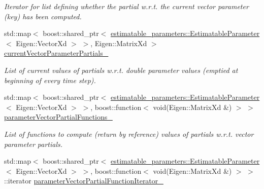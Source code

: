 \begin{DoxyCompactItemize}
\begin{DoxyCompactList}\small\item\em Iterator for list defining whether the partial w.\+r.\+t. the current vector parameter (key) has been computed. \end{DoxyCompactList}\item 
std\+::map$<$ boost\+::shared\+\_\+ptr$<$ \hyperlink{classtudat_1_1estimatable__parameters_1_1EstimatableParameter}{estimatable\+\_\+parameters\+::\+Estimatable\+Parameter}$<$ Eigen\+::\+Vector\+Xd $>$ $>$, Eigen\+::\+Matrix\+Xd $>$ \hyperlink{classtudat_1_1orbit__determination_1_1StateDerivativePartial_a292c098fe8abe021bfb919073e60e8db}{current\+Vector\+Parameter\+Partials\+\_\+}\hypertarget{classtudat_1_1orbit__determination_1_1StateDerivativePartial_a292c098fe8abe021bfb919073e60e8db}{}\label{classtudat_1_1orbit__determination_1_1StateDerivativePartial_a292c098fe8abe021bfb919073e60e8db}

\begin{DoxyCompactList}\small\item\em List of current values of partials w.\+r.\+t. double parameter values (emptied at beginning of every time step). \end{DoxyCompactList}\item 
std\+::map$<$ boost\+::shared\+\_\+ptr$<$ \hyperlink{classtudat_1_1estimatable__parameters_1_1EstimatableParameter}{estimatable\+\_\+parameters\+::\+Estimatable\+Parameter}$<$ Eigen\+::\+Vector\+Xd $>$ $>$, boost\+::function$<$ void(Eigen\+::\+Matrix\+Xd \&) $>$ $>$ \hyperlink{classtudat_1_1orbit__determination_1_1StateDerivativePartial_ab128fab795401795f782d0c4a5045a21}{parameter\+Vector\+Partial\+Functions\+\_\+}\hypertarget{classtudat_1_1orbit__determination_1_1StateDerivativePartial_ab128fab795401795f782d0c4a5045a21}{}\label{classtudat_1_1orbit__determination_1_1StateDerivativePartial_ab128fab795401795f782d0c4a5045a21}

\begin{DoxyCompactList}\small\item\em List of functions to compute (return by reference) values of partials w.\+r.\+t. vector parameter partials. \end{DoxyCompactList}\item 
std\+::map$<$ boost\+::shared\+\_\+ptr$<$ \hyperlink{classtudat_1_1estimatable__parameters_1_1EstimatableParameter}{estimatable\+\_\+parameters\+::\+Estimatable\+Parameter}$<$ Eigen\+::\+Vector\+Xd $>$ $>$, boost\+::function$<$ void(Eigen\+::\+Matrix\+Xd \&) $>$ $>$\+::iterator \hyperlink{classtudat_1_1orbit__determination_1_1StateDerivativePartial_a4eeb4bc7669f5512e47eaf5cc0e3143d}{parameter\+Vector\+Partial\+Function\+Iterator\+\_\+}\hypertarget{classtudat_1_1orbit__determination_1_1StateDerivativePartial_a4eeb4bc7669f5512e47eaf5cc0e3143d}{}\label{classtudat_1_1orbit__determination_1_1StateDerivativePartial_a4eeb4bc7669f5512e47eaf5cc0e3143d}


\end{DoxyCompactItemize}
